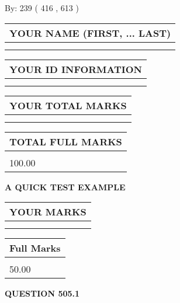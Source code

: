 \documentclass[12pt]{article}
\begin{document}
   
\hspace{1.0in} By: 
 239 ( 416 ,  613 )
   
   
   
   
\newpage 
\setcounter{page}{ 
   505001 } 
   
   
   
   
\noindent\begin{tabular}{|l|}
\hline
YOUR NAME (FIRST, ... LAST)  \\
\hline
 \\ 
 \\ 
\hline
\end{tabular}
\hspace{0.05in} \begin{tabular}{|l|}
\hline
 YOUR   ID   INFORMATION  \\
\hline
 \\ 
 \\ 
\hline
\end{tabular}
   
   
\vspace{0.2in}\noindent\begin{tabular}{|l|}
\hline
YOUR TOTAL MARKS  \\
\hline
 \\ 
 \\ 
\hline
\end{tabular}
\hspace{0.05in} \begin{tabular}{|l|}
\hline
TOTAL FULL MARKS  \\
\hline
 \\ 
100.00 \\
\hline
\end{tabular}
   
   
 \vspace{0.2in}
{\LARGE {\textbf{ A QUICK TEST EXAMPLE}}}
   
   
  
\vspace{0.2in}
  
\noindent\begin{tabular}{|l|}
\hline
 YOUR MARKS  \\
\hline
 \\ 
 \\ 
\hline
\end{tabular}
\hspace{0.05in} \begin{tabular}{|l|}
\hline
 Full Marks  \\
\hline
 \\ 
50.00 \\
\hline
\end{tabular}
{\textbf{\Large{QUESTION
505.1 
}}}
  
\end{document}
